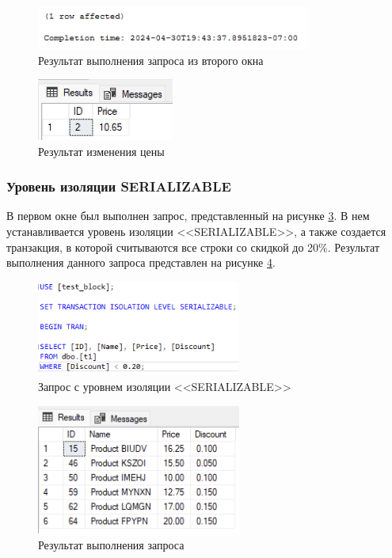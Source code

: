 \documentclass[a4paper, 14pt]{extarticle}
\begin{document}
\begin{figure}[H]
  \centering
  \includegraphics[width=0.8\textwidth]{images/task-3/13.png}
  \caption{Результат выполнения запроса из второго окна}
  \label{fig:task-3-13}
\end{figure}

\begin{figure}[H]
  \centering
  \includegraphics[width=0.4\textwidth]{images/task-3/14.png}
  \caption{Результат изменения цены}
  \label{fig:task-3-14}
\end{figure}

\subsubsection{Уровень изоляции SERIALIZABLE}

В первом окне был выполнен запрос, представленный на рисунке
\ref{fig:task-3-15}. В нем устанавливается уровень изоляции
<<\foreignlanguage{english}{SERIALIZABLE}>>, а также создается транзакция,
в которой считываются все строки со скидкой до 20\%. Результат выполнения
данного запроса представлен на рисунке \ref{fig:task-3-16}.

\begin{figure}[H]
  \centering
  \includegraphics[width=0.6\textwidth]{images/task-3/15.png}
  \caption{
    Запрос с уровнем изоляции <<\foreignlanguage{english}{SERIALIZABLE}>>
  }
  \label{fig:task-3-15}
\end{figure}

\begin{figure}[H]
  \centering
  \includegraphics[width=0.6\textwidth]{images/task-3/16.png}
  \caption{Результат выполнения запроса}
  \label{fig:task-3-16}
\end{figure}
\end{document}
